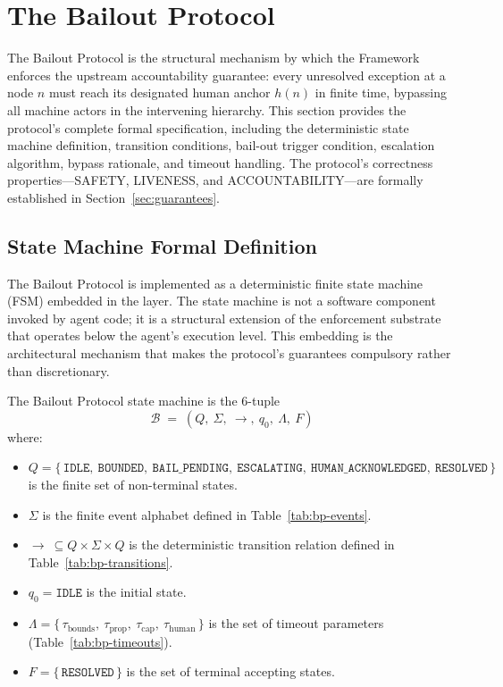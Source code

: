 \section{The Bailout Protocol}
\label{sec:bailout-protocol}

The Bailout Protocol is the structural mechanism by which the \bxthree{} Framework enforces the upstream accountability guarantee: every unresolved exception at a node $n$ must reach its designated human anchor $h(n)$ in finite time, bypassing all machine actors in the intervening hierarchy. This section provides the protocol's complete formal specification, including the deterministic state machine definition, transition conditions, bail-out trigger condition, escalation algorithm, bypass rationale, and timeout handling. The protocol's correctness properties---SAFETY, LIVENESS, and ACCOUNTABILITY---are formally established in Section~\ref{sec:guarantees}.

\subsection{State Machine Formal Definition}
\label{sec:bp-state-machine}

The Bailout Protocol is implemented as a deterministic finite state machine (FSM) embedded in the \fact{} layer. The state machine is not a software component invoked by agent code; it is a structural extension of the enforcement substrate that operates below the agent's execution level. This embedding is the architectural mechanism that makes the protocol's guarantees compulsory rather than discretionary.

\begin{definition}
\label{def:bp-state-machine}
The Bailout Protocol state machine is the 6-tuple
\[
\mathcal{B} \;=\; (Q,\ \Sigma,\ \rightarrow,\ q_0,\ \Lambda,\ F)
\]
where:
\begin{itemize}\itemsep=0pt
\item $Q = \{\,\texttt{IDLE},\ \texttt{BOUNDED},\ \texttt{BAIL\_PENDING},\ \texttt{ESCALATING},\ \texttt{HUMAN\_ACKNOWLEDGED},\ \texttt{RESOLVED}\,\}$ is the finite set of non-terminal states.
\item $\Sigma$ is the finite event alphabet defined in Table~\ref{tab:bp-events}.
\item $\rightarrow\ \subseteq Q \times \Sigma \times Q$ is the deterministic transition relation defined in Table~\ref{tab:bp-transitions}.
\item $q_0 = \texttt{IDLE}$ is the initial state.
\item $\Lambda = \{\,\tau_{\text{bounds}},\ \tau_{\text{prop}},\ \tau_{\text{cap}},\ \tau_{\text{human}}\,\}$ is the set of timeout parameters (Table~\ref{tab:bp-timeouts}).
\item $F = \{\,\texttt{RESOLVED}\,\}$ is the set of terminal accepting states.
\end{itemize}
\end{definition}

